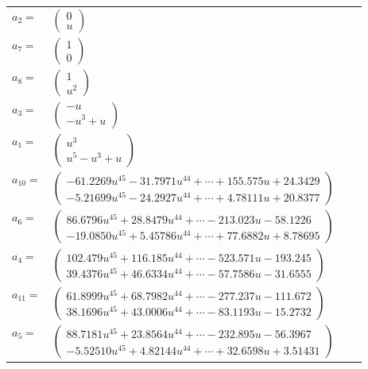 \documentclass[1p]{elsarticle_modified}
\theoremstyle{definition}
\begin{document}
\begin{tabular}{m{7pt} m{180pt} m{7pt} m{180pt} }
\flushright $a_{2}=$&$\begin{pmatrix}0\\u\end{pmatrix}$ \\
\flushright $a_{7}=$&$\begin{pmatrix}1\\0\end{pmatrix}$ \\
\flushright $a_{8}=$&$\begin{pmatrix}1\\u^2\end{pmatrix}$ \\
\flushright $a_{3}=$&$\begin{pmatrix}- u\\- u^3+u\end{pmatrix}$ \\
\flushright $a_{1}=$&$\begin{pmatrix}u^3\\u^5- u^3+u\end{pmatrix}$ \\
\flushright $a_{10}=$&$\begin{pmatrix}-61.2269 u^{45}-31.7971 u^{44}+\cdots+155.575 u+24.3429\\-5.21699 u^{45}-24.2927 u^{44}+\cdots+4.78111 u+20.8377\end{pmatrix}$ \\
\flushright $a_{6}=$&$\begin{pmatrix}86.6796 u^{45}+28.8479 u^{44}+\cdots-213.023 u-58.1226\\-19.0850 u^{45}+5.45786 u^{44}+\cdots+77.6882 u+8.78695\end{pmatrix}$ \\
\flushright $a_{4}=$&$\begin{pmatrix}102.479 u^{45}+116.185 u^{44}+\cdots-523.571 u-193.245\\39.4376 u^{45}+46.6334 u^{44}+\cdots-57.7586 u-31.6555\end{pmatrix}$ \\
\flushright $a_{11}=$&$\begin{pmatrix}61.8999 u^{45}+68.7982 u^{44}+\cdots-277.237 u-111.672\\38.1696 u^{45}+43.0006 u^{44}+\cdots-83.1193 u-15.2732\end{pmatrix}$ \\
\flushright $a_{5}=$&$\begin{pmatrix}88.7181 u^{45}+23.8564 u^{44}+\cdots-232.895 u-56.3967\\-5.52510 u^{45}+4.82144 u^{44}+\cdots+32.6598 u+3.51431\end{pmatrix}$ \\

\end{tabular}
\end{document}
